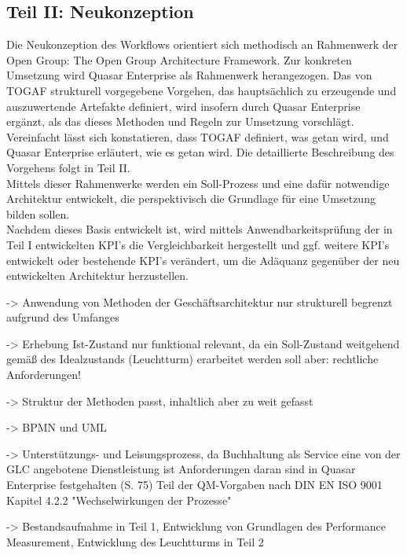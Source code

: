 \subsection{Teil II: Neukonzeption}

Die Neukonzeption des Workflows orientiert sich methodisch an Rahmenwerk der Open Group: The Open Group Architecture Framework. 
Zur konkreten Umsetzung wird Quasar Enterprise als Rahmenwerk herangezogen. 
Das von TOGAF strukturell vorgegebene Vorgehen, das hauptsächlich zu erzeugende und auszuwertende Artefakte definiert, wird insofern durch Quasar Enterprise ergänzt, als das dieses Methoden und Regeln zur Umsetzung vorschlägt. 
Vereinfacht lässt sich konstatieren, dass TOGAF definiert, was getan wird, und Quasar Enterprise erläutert, wie es getan wird. 
Die detaillierte Beschreibung des Vorgehens folgt in Teil II.\\
Mittels dieser Rahmenwerke werden ein Soll-Prozess und eine dafür notwendige Architektur entwickelt, die perspektivisch die Grundlage für eine Umsetzung bilden sollen.\\
Nachdem dieses Basis entwickelt ist, wird mittels Anwendbarkeitsprüfung der in Teil I entwickelten KPI's die Vergleichbarkeit hergestellt und ggf. weitere KPI's entwickelt oder bestehende KPI's verändert, um die Adäquanz gegenüber der neu entwickelten Architektur herzustellen.

-> Anwendung von Methoden der Geschäftsarchitektur nur strukturell begrenzt aufgrund des Umfanges

-> Erhebung Ist-Zustand nur funktional relevant, da ein Soll-Zustand weitgehend gemäß des Idealzustands (Leuchtturm) erarbeitet werden soll
aber: rechtliche Anforderungen!

-> Struktur der Methoden passt, inhaltlich aber zu weit gefasst

-> BPMN und UML

-> Unterstützungs- und Leisungsprozess, da Buchhaltung als Service eine von der GLC angebotene Dienstleistung ist
Anforderungen daran sind in Quasar Enterprise festgehalten (S. 75)
Teil der QM-Vorgaben nach DIN EN ISO 9001 Kapitel 4.2.2 "Wechselwirkungen der Prozesse" 

-> Bestandsaufnahme in Teil 1, Entwicklung von Grundlagen des Performance Measurement, Entwicklung des Leuchtturms in Teil 2

\subsection{}